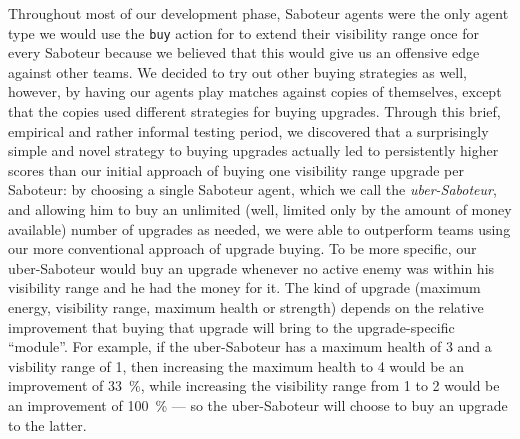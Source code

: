 \begin{description}
        Throughout most of our development phase, Saboteur agents were the only agent type we would use the \texttt{buy} action for to extend their visibility range once for every Saboteur because we believed that this would give us an offensive edge against other teams.
        We decided to try out other buying strategies as well, however, by having our agents play matches against copies of themselves, except that the copies used different strategies for buying upgrades.
        Through this brief, empirical and rather informal testing period, we discovered that a surprisingly simple and novel strategy to buying upgrades actually led to persistently higher scores than our initial approach of buying one visibility range upgrade per Saboteur: by choosing a single Saboteur agent, which we call the \emph{uber-Saboteur}, and allowing him to buy an unlimited (well, limited only by the amount of money available) number of upgrades as needed, we were able to outperform teams using our more conventional approach of upgrade buying.
        To be more specific, our uber-Saboteur would buy an upgrade whenever no active enemy was within his visibility range and he had the money for it.
        The kind of upgrade (maximum energy, visibility range, maximum health or strength) depends on the relative improvement that buying that upgrade will bring to the upgrade-specific \enquote{module}.
        For example, if the uber-Saboteur has a maximum health of 3 and a visbility range of 1, then increasing the maximum health to 4 would be an improvement of \SI{33}{\percent}, while increasing the visibility range from 1 to 2 would be an improvement of \SI{100}{\percent} --- so the uber-Saboteur will choose to buy an upgrade to the latter.


\end{description}
